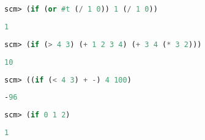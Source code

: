 \begin{lstlisting}[language=Scheme]
    scm> (if (or #t (/ 1 0)) 1 (/ 1 0))
    \end{lstlisting}
    \begin{solution}[0.15in]
    \begin{lstlisting}[language=Scheme]
    1
    \end{lstlisting}
    \end{solution}
    
    \begin{lstlisting}[language=Scheme]
    scm> (if (> 4 3) (+ 1 2 3 4) (+ 3 4 (* 3 2)))
    \end{lstlisting}
    \begin{solution}[0.15in]
    \begin{lstlisting}[language=Scheme]
    10
    \end{lstlisting}
    \end{solution}
    
    \begin{lstlisting}[language=Scheme]
    scm> ((if (< 4 3) + -) 4 100)
    \end{lstlisting}
    \begin{solution}[0.15in]
    \begin{lstlisting}[language=Scheme]
    -96
    \end{lstlisting}
    \end{solution}
    
    \begin{lstlisting}[language=Scheme]
    scm> (if 0 1 2)
    \end{lstlisting}
    \begin{solution}[0.15in]
    \begin{lstlisting}[language=Scheme]
    1
    \end{lstlisting}
    \end{solution}
    
    